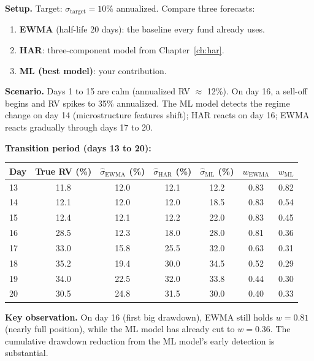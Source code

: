 \begin{workedexample}
\textbf{Setup.} Target: $\sigma_{\text{target}} = 10\%$ annualized. Compare three forecasts:
\begin{enumerate}[label=(\alph*)]
  \item \textbf{EWMA} (half-life 20 days): the baseline every fund already uses.
  \item \textbf{HAR}: three-component model from Chapter~\ref{ch:har}.
  \item \textbf{ML (best model)}: your contribution.
\end{enumerate}

\textbf{Scenario.} Days 1 to 15 are calm (annualized RV $\approx$ 12\%). On day 16, a sell-off begins and RV spikes to 35\% annualized. The ML model detects the regime change on day 14 (microstructure features shift); HAR reacts on day 16; EWMA reacts gradually through days 17 to 20.

\medskip
\noindent\textbf{Transition period (days 13 to 20):}

\begin{center}
\begin{tabular}{@{}lcccccc@{}}
\toprule
Day & True RV (\%) & $\hat\sigma_{\text{EWMA}}$ (\%) & $\hat\sigma_{\text{HAR}}$ (\%) & $\hat\sigma_{\text{ML}}$ (\%) & $w_{\text{EWMA}}$ & $w_{\text{ML}}$ \\
\midrule
13 & 11.8 & 12.0 & 12.1 & 12.2 & 0.83 & 0.82 \\
14 & 12.1 & 12.0 & 12.0 & 18.5 & 0.83 & 0.54 \\
15 & 12.4 & 12.1 & 12.2 & 22.0 & 0.83 & 0.45 \\
16 & 28.5 & 12.3 & 18.0 & 28.0 & 0.81 & 0.36 \\
17 & 33.0 & 15.8 & 25.5 & 32.0 & 0.63 & 0.31 \\
18 & 35.2 & 19.4 & 30.0 & 34.5 & 0.52 & 0.29 \\
19 & 34.0 & 22.5 & 32.0 & 33.8 & 0.44 & 0.30 \\
20 & 30.5 & 24.8 & 31.5 & 30.0 & 0.40 & 0.33 \\
\bottomrule
\end{tabular}
\end{center}

\medskip
\noindent\textbf{Key observation.} On day 16 (first big drawdown), EWMA still holds $w = 0.81$ (nearly full position), while the ML model has already cut to $w = 0.36$.
The cumulative drawdown reduction from the ML model's early detection is substantial.


\end{workedexample}
